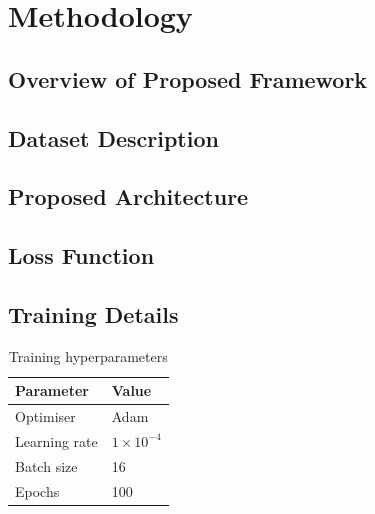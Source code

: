 
\chapter{Methodology}
\label{ch:methodology}

\section{Overview of Proposed Framework}


\section{Dataset Description}
\label{sec:datasets}

\section{Proposed Architecture}
\label{sec:arch}

%

\section{Loss Function}
\label{sec:loss}

\section{Training Details}
\label{sec:training}

\begin{table}[H]
  \centering
  \caption{Training hyperparameters}
  \label{tab:hyperparams}
  \begin{tabular}{ll}
    \toprule
    \textbf{Parameter} & \textbf{Value} \\
    \midrule
    Optimiser     & Adam \\
    Learning rate & $1 \times 10^{-4}$ \\
    Batch size    & 16 \\
    Epochs        & 100 \\
    \bottomrule
  \end{tabular}
\end{table}

